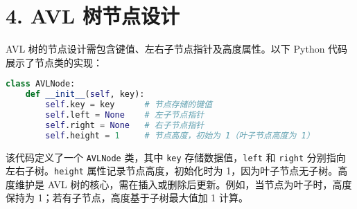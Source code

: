 \chapter{4. AVL 树节点设计}
AVL 树的节点设计需包含键值、左右子节点指针及高度属性。以下 Python 代码展示了节点类的实现：\par
\begin{lstlisting}[language=python]
class AVLNode:
    def __init__(self, key):
        self.key = key      # 节点存储的键值
        self.left = None    # 左子节点指针
        self.right = None   # 右子节点指针
        self.height = 1     # 节点高度，初始为 1（叶子节点高度为 1）
\end{lstlisting}
该代码定义了一个 \texttt{AVLNode} 类，其中 \texttt{key} 存储数据值，\texttt{left} 和 \texttt{right} 分别指向左右子树。\texttt{height} 属性记录节点高度，初始化时为 1，因为叶子节点无子树。高度维护是 AVL 树的核心，需在插入或删除后更新。例如，当节点为叶子时，高度保持为 1；若有子节点，高度基于子树最大值加 1 计算。\par
